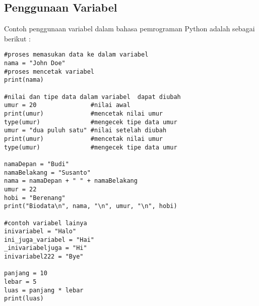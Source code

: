 \subsection{Penggunaan Variabel}
Contoh penggunaan variabel  dalam bahasa pemrograman Python adalah sebagai berikut :

\begin{verbatim}
#proses memasukan data ke dalam variabel
nama = "John Doe"
#proses mencetak variabel
print(nama)

#nilai dan tipe data dalam variabel  dapat diubah
umur = 20               #nilai awal
print(umur)             #mencetak nilai umur
type(umur)              #mengecek tipe data umur
umur = "dua puluh satu" #nilai setelah diubah
print(umur)             #mencetak nilai umur
type(umur)              #mengecek tipe data umur

namaDepan = "Budi"
namaBelakang = "Susanto"
nama = namaDepan + " " + namaBelakang
umur = 22
hobi = "Berenang"
print("Biodata\n", nama, "\n", umur, "\n", hobi)

#contoh variabel lainya
inivariabel = "Halo"
ini_juga_variabel = "Hai"
_inivariabeljuga = "Hi"
inivariabel222 = "Bye" 

panjang = 10
lebar = 5
luas = panjang * lebar
print(luas)
\end{verbatim}
